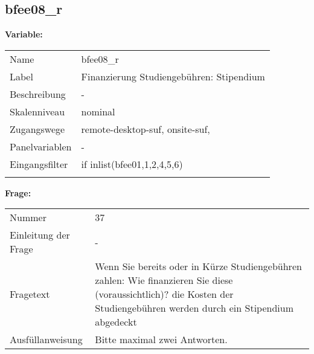 	
	
	\subsection{bfee08\_r}
	\label{subSection:bfee08_r}

	\noindent\textbf{Variable:}\\
		\begin{tabular}{lL{11.3cm}}
			\label{tableVariable:bfee08_r}
			Name & bfee08\_r \\
			Label & Finanzierung Studiengebühren: Stipendium \\
			Beschreibung & - \\
			Skalenniveau & nominal \\
			Zugangswege &
				remote-desktop-suf,
				onsite-suf,
 \\
			Panelvariablen & -
			 \\
			Eingangsfilter & if inlist(bfee01,1,2,4,5,6) \\
 \\
		\end{tabular}

		\vspace*{1 cm}
		\noindent\textbf{Frage:}\\
		\begin{tabular}{lL{11.3cm}}
			\label{tableQuestion:bfee08_r}
			Nummer & 37 \\
			Einleitung der Frage & - \\
			Fragetext & Wenn Sie bereits oder in Kürze Studiengebühren zahlen: Wie finanzieren Sie diese (voraussichtlich)?
die Kosten der Studiengebühren werden durch ein Stipendium abgedeckt \\
			Ausfüllanweisung & Bitte maximal zwei Antworten. \\
		\end{tabular}





